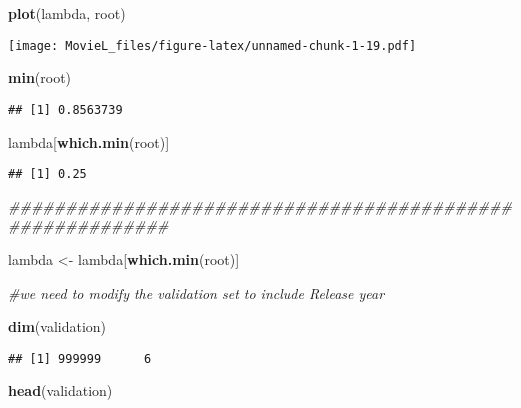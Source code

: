 \documentclass[
]{article}
\newenvironment{Shaded}{\begin{snugshade}}{\end{snugshade}}
\newcommand{\CommentTok}[1]{\textcolor[rgb]{0.56,0.35,0.01}{\textit{#1}}}
\newcommand{\KeywordTok}[1]{\textcolor[rgb]{0.13,0.29,0.53}{\textbf{#1}}}
\newcommand{\NormalTok}[1]{#1}
\newcommand{\StringTok}[1]{\textcolor[rgb]{0.31,0.60,0.02}{#1}}
\begin{document}
\begin{Shaded}
\begin{Highlighting}[]
\KeywordTok{plot}\NormalTok{(lambda, root)}
\end{Highlighting}
\end{Shaded}

\texttt{[image: MovieL\_files/figure-latex/unnamed-chunk-1-19.pdf]}

\begin{Shaded}
\begin{Highlighting}[]
\KeywordTok{min}\NormalTok{(root)}
\end{Highlighting}
\end{Shaded}

\begin{verbatim}
## [1] 0.8563739
\end{verbatim}

\begin{Shaded}
\begin{Highlighting}[]
\NormalTok{lambda[}\KeywordTok{which.min}\NormalTok{(root)]}
\end{Highlighting}
\end{Shaded}

\begin{verbatim}
## [1] 0.25
\end{verbatim}

\begin{Shaded}
\begin{Highlighting}[]
\CommentTok{##########################################################}

\NormalTok{lambda <-}\StringTok{ }\NormalTok{lambda[}\KeywordTok{which.min}\NormalTok{(root)]}

\CommentTok{#we need to modify the validation set to include Release year}

\KeywordTok{dim}\NormalTok{(validation)}
\end{Highlighting}
\end{Shaded}

\begin{verbatim}
## [1] 999999      6
\end{verbatim}

\begin{Shaded}
\begin{Highlighting}[]
\KeywordTok{head}\NormalTok{(validation)}
\end{Highlighting}
\end{Shaded}
\end{document}
